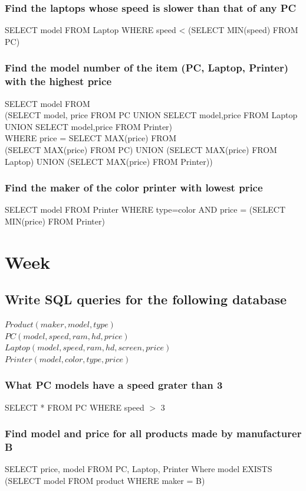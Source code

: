 \documentclass[12pt, a4paper]{article}
\begin{document}
			\subsubsection{Find the laptops whose speed is slower than that of any PC}
				SELECT model FROM Laptop WHERE speed < (SELECT MIN(speed) FROM PC)
			\subsubsection{Find the model number of the item (PC, Laptop, Printer) with the highest price}
				SELECT model FROM \\
					(SELECT model, price FROM PC UNION SELECT model,price FROM Laptop UNION SELECT model,price FROM Printer) \\
					WHERE price = SELECT MAX(price) FROM \\
						(SELECT MAX(price) FROM PC) UNION (SELECT MAX(price) FROM Laptop) UNION  (SELECT MAX(price) FROM Printer)) 
			\subsubsection{Find the maker of the color printer with lowest price}
				SELECT model FROM Printer WHERE type=color AND price = (SELECT MIN(price) FROM Printer)
	\section{Week}
		\subsection{Write SQL queries for the following database}
			$Product(maker, model, type)$\\
			$PC(model, speed,ram, hd, price)$\\
			$Laptop(model, speed, ram, hd ,screen, price)$\\
			$Printer(model, color, type, price)$
			\subsubsection{What PC models have a speed grater than 3}
				SELECT * FROM PC WHERE speed $>$ 3
			\subsubsection{Find model and price for all products made by manufacturer B}
				SELECT price, model FROM PC, Laptop, Printer Where model EXISTS (SELECT model FROM product WHERE maker = B)
\end{document}
